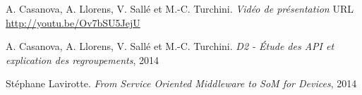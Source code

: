 \documentclass[nocopyrightspace]{sigplanconf}
\begin{document}



\begin{thebibliography}{10}
\softraggedright

A. Casanova, A. Llorens, V. Sallé et M.-C. Turchini.
\newblock \emph{Vidéo de présentation}
\newblock URL \url{http://youtu.be/Ov7bSU5JejU}

A. Casanova, A. Llorens, V. Sallé et M.-C. Turchini.
\newblock \emph{D2 - Étude des API et explication des regroupements},
2014

Stéphane Lavirotte.
\newblock \emph{From Service Oriented Middleware to SoM for Devices},
2014

\end{thebibliography}
\end{document}
